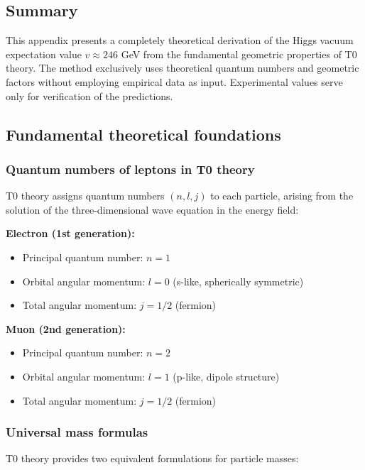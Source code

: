 \documentclass[12pt,a4paper]{article}
\begin{document}
\subsection{Summary}

This appendix presents a completely theoretical derivation of the Higgs vacuum expectation value $v \approx 246$ GeV from the fundamental geometric properties of T0 theory. The method exclusively uses theoretical quantum numbers and geometric factors without employing empirical data as input. Experimental values serve only for verification of the predictions.

\subsection{Fundamental theoretical foundations}

\subsubsection{Quantum numbers of leptons in T0 theory}

T0 theory assigns quantum numbers $(n, l, j)$ to each particle, arising from the solution of the three-dimensional wave equation in the energy field:

\textbf{Electron (1st generation):}
\begin{itemize}
	\item Principal quantum number: $n = 1$
	\item Orbital angular momentum: $l = 0$ (s-like, spherically symmetric)
	\item Total angular momentum: $j = 1/2$ (fermion)
\end{itemize}

\textbf{Muon (2nd generation):}
\begin{itemize}
	\item Principal quantum number: $n = 2$
	\item Orbital angular momentum: $l = 1$ (p-like, dipole structure)
	\item Total angular momentum: $j = 1/2$ (fermion)
\end{itemize}

\subsubsection{Universal mass formulas}

T0 theory provides two equivalent formulations for particle masses:
\end{document}
